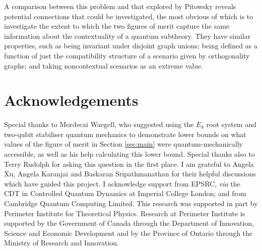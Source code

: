 \documentclass{amsart}
\theoremstyle{definition}
\begin{document}
A comparison between this problem and that explored by Pitowsky reveals potential connections that could be investigated, the most obvious of which is to investigate the extent to which the two figures of merit capture the same information about the contextuality of a quantum subtheory. They have similar properties, such as being invariant under disjoint graph unions; being defined as a function of just the compatibility structure of a scenario given by orthogonality graphs; and taking noncontextual scenarios as an extreme value.

\section{Acknowledgements}
Special thanks to Mordecai Waegell, who suggested using the $E_8$ root system and two-qubit stabiliser quantum mechanics to demonstrate lower bounds on what values of the figure of merit in Section \ref{sec:main} were quantum-mechanically accessible, as well as his help calculating this lower bound.
Special thanks also to Terry Rudolph for asking this question in the first place.
I am grateful to Angela Xu, Angela Karanjai and Baskaran Sripathmanathan for their helpful discussions which have guided this project. I acknowledge support from EPSRC, \emph{via} the CDT in Controlled Quantum Dynamics at Imperial College London; and from Cambridge Quantum Computing Limited. This research was supported in part by Perimeter Institute for Theoretical Physics. Research at Perimeter Institute is supported by the Government of Canada through the Department of Innovation, Science and Economic Development and by the Province of Ontario through the Ministry of Research and Innovation.

{}

\end{document}
